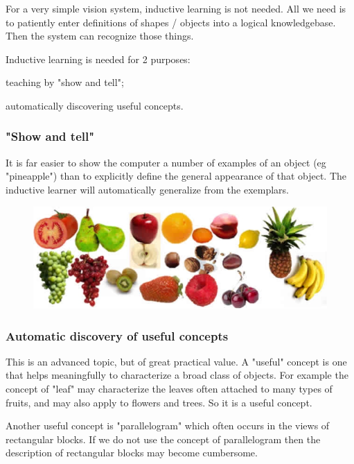 For a very simple vision system, inductive learning is not needed. All we need is to  patiently enter  definitions of shapes / objects into a logical knowledgebase. Then the system can recognize those things. 

Inductive learning is needed for 2 purposes:
\begin{compactenum}
	\item  teaching by "show and tell";
	\item  automatically discovering useful concepts.
\end{compactenum}

\subsubsection{"Show and tell"}

It is far easier to show the computer a number of examples of an object (eg "pineapple") than to explicitly define the general appearance of that object. The inductive learner will automatically generalize from the exemplars.

\begin{figure}[H]
\centering
\includegraphics[scale=0.7]{Fruits.png}
\end{figure}

\subsubsection{Automatic discovery of useful concepts}

This is an advanced topic, but of great practical value. A "useful" concept is one that helps meaningfully to characterize a broad class of objects. For example the concept of "leaf" may characterize the leaves often attached to many types of fruits, and may also apply to flowers and trees. So it is a useful concept.

Another useful concept is "parallelogram" which often occurs in the views of rectangular blocks. If we do not use the concept of parallelogram then the description of rectangular blocks may become cumbersome.

